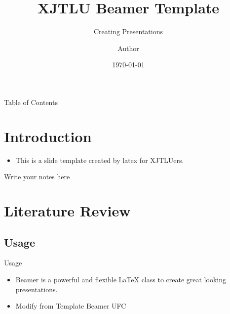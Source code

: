 \documentclass{libs/XJTLU_format}
\title[XJTLU Beamer Template]{\huge\textbf{XJTLU Beamer Template}}
\subtitle{Creating Presentations}
\author{Author}
\institute[XJTLU]{
    \normalsize{\email{author@xjtlu.edu.cn}}
    \newline
    \department{School of Advanced Technology}
    \newline
    \university{Xi’an Jiaotong-Liverpool University}
}
\date{\today}
\begin{document}


\begin{frame}{}
    \maketitle
\end{frame}

\begin{frame}{Table of Contents}
    \begin{multicols}{2}
        \tableofcontents
    \end{multicols}
\end{frame}

\section{Introduction}

\begin{frame}
    \begin{itemize}[<+-| alert@+>] %
    	\item This is a slide template created by latex for XJTLUers.
    \end{itemize}
    
    \begin{note}
        {Write your notes here}
    \end{note}
\end{frame}

\section{Literature Review}

\subsection{Usage}

\begin{frame}{Usage}
    \begin{itemize}
        \item Beamer is a powerful and flexible \LaTeX{} class to create great looking presentations.   
        \item Modify from Template Beamer UFC \cite{origin}
    \end{itemize}
\end{frame}
\end{document}
